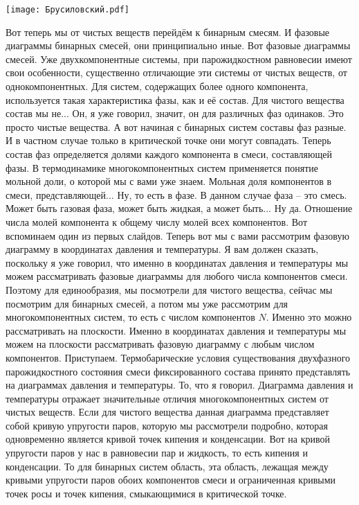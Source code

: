 \documentclass[main.tex]{subfiles}
\begin{document}
\begin{center}
\texttt{[image: Брусиловский.pdf]}
\end{center}

Вот теперь мы от чистых веществ перейдём к бинарным смесям.
И фазовые диаграммы бинарных смесей, они принципиально иные.
Вот фазовые диаграммы смесей.
Уже двухкомпонентные системы, при парожидкостном равновесии имеют свои особенности, существенно отличающие эти системы от чистых веществ, от однокомпонентных.
Для систем, содержащих более одного компонента, используется такая характеристика фазы, как и её состав.
Для чистого вещества состав мы не...
Он, я уже говорил, значит, он для различных фаз одинаков.
Это просто чистые вещества.
А вот начиная с бинарных систем составы фаз разные.
И в частном случае только в критической точке они могут совпадать.
Теперь состав фаз определяется долями каждого компонента в смеси, составляющей фазы.
В термодинамике многокомпонентных систем применяется понятие мольной доли, о которой мы с вами уже знаем.
Мольная доля компонентов в смеси, представляющей...
Ну, то есть в фазе.
В данном случае фаза -- это смесь.
Может быть газовая фаза, может быть жидкая, а может быть...
Ну да.
Отношение числа молей компонента к общему числу молей всех компонентов.
Вот вспоминаем один из первых слайдов.
Теперь вот мы с вами рассмотрим фазовую диаграмму в координатах давления и температуры.
Я вам должен сказать, поскольку я уже говорил, что именно в координатах давления и температуры мы можем рассматривать фазовые диаграммы для любого числа компонентов смеси.
Поэтому для единообразия, мы посмотрели для чистого вещества, сейчас мы посмотрим для бинарных смесей, а потом мы уже рассмотрим для многокомпонентных систем, то есть с числом компонентов $N$.
Именно это можно рассматривать на плоскости.
Именно в координатах давления и температуры мы можем на плоскости рассматривать фазовую диаграмму с любым числом компонентов.
Приступаем.
Термобарические условия существования двухфазного парожидкостного состояния смеси фиксированного состава принято представлять на диаграммах давления и температуры.
То, что я говорил.
Диаграмма давления и температуры отражает значительные отличия многокомпонентных систем от чистых веществ.
Если для чистого вещества данная диаграмма представляет собой кривую упругости паров, которую мы рассмотрели подробно, которая одновременно является кривой точек кипения и конденсации.
Вот на кривой упругости паров у нас в равновесии пар и жидкость, то есть кипения и конденсации.
То для бинарных систем область, эта область, лежащая между кривыми упругости паров обоих компонентов смеси и ограниченная кривыми точек росы и точек кипения, смыкающимися в критической точке.
\end{document}
